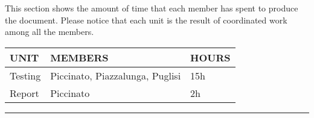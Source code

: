 \documentclass{Configuration_Files/Template}
\begin{document}
This section shows the amount of time that each member has spent to produce the document. Please notice that each unit is the result of coordinated work among all the members.

\begin{table}[h]
\centering
\begin{tabularx}{\textwidth}{| X | X | X |}
\hline
\textbf{UNIT} & \textbf{MEMBERS} & \textbf{HOURS} \\ [1ex]
\hline
Testing & Piccinato, Piazzalunga, Puglisi & 15h \\ [1ex]
Report & Piccinato & 2h \\ [1ex]
\hline
\end{tabularx}
\end{table}

{\color{bluepoli}\rule{\linewidth}{0.1pt}}
\end{document}
